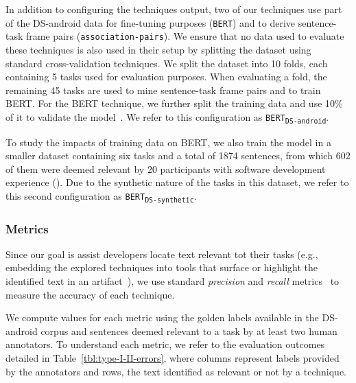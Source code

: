 In addition to configuring the techniques output, two of our techniques use part of the  \acs{DS-android} data for fine-tuning purposes (\texttt{BERT}) and to derive sentence-task frame pairs (\texttt{association-pairs}).
We ensure that no data used to evaluate these techniques is also used in their setup by 
splitting the dataset using standard cross-validation techniques.
We split the dataset into 10 folds, each containing 5 tasks used for evaluation purposes. When evaluating a fold, the remaining 45 tasks are used to mine sentence-task frame pairs
and to train BERT. 
For the BERT technique, we further split the training data and use 10\% of it to validate the model~\cite{Chaparro2017, fucci2019, Petrosyan2015}.
We refer to this configuration as \texttt{BERT\textsubscript{DS-android}}.


To study the impacts of training data on BERT, we also train the model in a smaller dataset containing six tasks and a total of 1874 sentences, from which 602 of them were deemed relevant by 20 participants with software development experience (). Due to the synthetic nature of the tasks in this dataset, we refer to this 
second configuration as \texttt{BERT\textsubscript{DS-synthetic}}.




\subsubsection{Metrics}



Since our goal is assist developers locate text relevant tot their tasks (e.g., embedding the explored techniques into tools that 
surface or highlight the identified text in an artifact~\cite{Robillard2015}), 
we use standard \textit{precision} and \textit{recall} metrics~\cite{manning2010IR} to measure the accuracy of each technique.





We compute values for each metric using the golden labels available in the \acs{DS-android} corpus and sentences deemed relevant to a task by at least two human annotators. 
To understand each metric, we refer to the evaluation outcomes detailed in Table~\ref{tbl:type-I-II-errors}, where
 columns represent  labels provided by the annotators and rows,
the text identified as relevant or not by a technique.

\medskip





